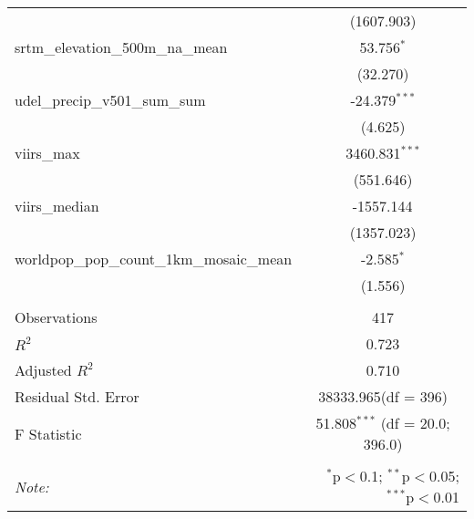 \begin{table}[!htbp]
\begin{tabular}{@{\extracolsep{5pt}}lc}
  & (1607.903) \\
 srtm_elevation_500m_na_mean & 53.756$^{*}$ \\
  & (32.270) \\
 udel_precip_v501_sum_sum & -24.379$^{***}$ \\
  & (4.625) \\
 viirs_max & 3460.831$^{***}$ \\
  & (551.646) \\
 viirs_median & -1557.144$^{}$ \\
  & (1357.023) \\
 worldpop_pop_count_1km_mosaic_mean & -2.585$^{*}$ \\
  & (1.556) \\
\hline \\[-1.8ex]
 Observations & 417 \\
 $R^2$ & 0.723 \\
 Adjusted $R^2$ & 0.710 \\
 Residual Std. Error & 38333.965(df = 396)  \\
 F Statistic & 51.808$^{***}$ (df = 20.0; 396.0) \\
\hline
\hline \\[-1.8ex]
\textit{Note:} & \multicolumn{1}{r}{$^{*}$p$<$0.1; $^{**}$p$<$0.05; $^{***}$p$<$0.01} \\
\end{tabular}
\end{table}
